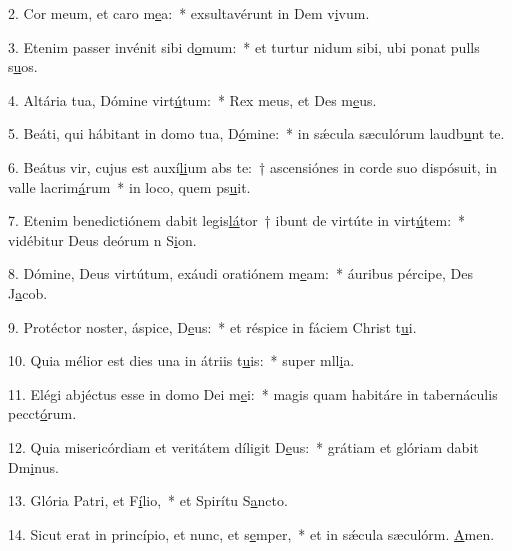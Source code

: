 2. Cor meum, et caro m\uline{e}a:~* exsultavérunt in Dem v\uline{i}vum.\par 
3. Etenim passer invénit sibi d\uline{o}mum:~* et turtur nidum sibi, ubi ponat pulls s\uline{u}os.\par 
4. Altária tua, Dómine virt\uline{ú}tum:~* Rex meus, et Des m\uline{e}us.\par 
5. Beáti, qui hábitant in domo tua, D\uline{ó}mine:~* in sǽcula sæculórum laudb\uline{u}nt te.\par 
6. Beátus vir, cujus est auxí\uline{li}um abs te:~† ascensiónes in corde suo dispósuit, in valle lacrim\uline{á}rum~* in loco, quem ps\uline{u}it.\par 
7. Etenim benedictiónem dabit legis\uline{lá}tor~† ibunt de virtúte in virt\uline{ú}tem:~* vidébitur Deus deórum n S\uline{i}on.\par 
8. Dómine, Deus virtútum, exáudi oratiónem m\uline{e}am:~* áuribus pércipe, Des J\uline{a}cob.\par 
9. Protéctor noster, áspice, D\uline{e}us:~* et réspice in fáciem Christ t\uline{u}i.\par 
10. Quia mélior est dies una in átriis t\uline{u}is:~* super mll\uline{i}a.\par 
11. Elégi abjéctus esse in domo Dei m\uline{e}i:~* magis quam habitáre in tabernáculis pecct\uline{ó}rum.\par 
12. Quia misericórdiam et veritátem díligit D\uline{e}us:~* grátiam et glóriam dabit Dm\uline{i}nus.\par 
13. Glória Patri, et F\uline{í}lio,~* et Spirítu S\uline{a}ncto.\par 
14. Sicut erat in princípio, et nunc, et s\uline{e}mper,~* et in sǽcula sæculórm. \uline{A}men.\par 

